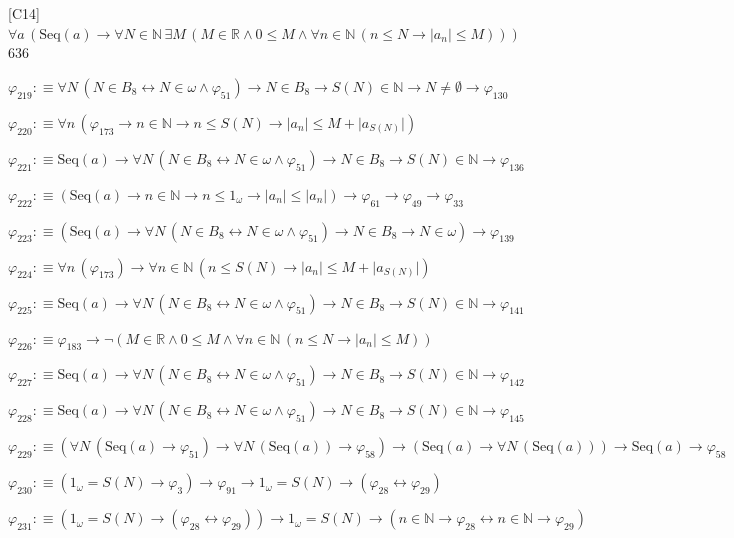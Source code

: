 \begin{fullproof}{[C14]}{$\forall a\,(\mathrm{Seq}(a) \to \forall N \in \mathbb{N}\,\exists M\,(M \in \mathbb{R} \land 0 \leq M \land \forall n \in \mathbb{N}\,(n \leq N \to \lvert a_{n} \rvert \leq M)))$}{636}
\begin{abbrevlist}
\item $\varphi_{219} :\equiv \forall N\,(N \in B_{8} \leftrightarrow N \in \omega \land \varphi_{51}) \to N \in B_{8} \to S(N) \in \mathbb{N} \to N \neq \emptyset \to \varphi_{130}$
\item $\varphi_{220} :\equiv \forall n\,(\varphi_{173} \to n \in \mathbb{N} \to n \leq S(N) \to \lvert a_{n} \rvert \leq M + \lvert a_{S(N)} \rvert)$
\item $\varphi_{221} :\equiv \mathrm{Seq}(a) \to \forall N\,(N \in B_{8} \leftrightarrow N \in \omega \land \varphi_{51}) \to N \in B_{8} \to S(N) \in \mathbb{N} \to \varphi_{136}$
\item $\varphi_{222} :\equiv (\mathrm{Seq}(a) \to n \in \mathbb{N} \to n \leq 1_{\omega} \to \lvert a_{n} \rvert \leq \lvert a_{n} \rvert) \to \varphi_{61} \to \varphi_{49} \to \varphi_{33}$
\item $\varphi_{223} :\equiv (\mathrm{Seq}(a) \to \forall N\,(N \in B_{8} \leftrightarrow N \in \omega \land \varphi_{51}) \to N \in B_{8} \to N \in \omega) \to \varphi_{139}$
\item $\varphi_{224} :\equiv \forall n\,(\varphi_{173}) \to \forall n \in \mathbb{N}\,(n \leq S(N) \to \lvert a_{n} \rvert \leq M + \lvert a_{S(N)} \rvert)$
\item $\varphi_{225} :\equiv \mathrm{Seq}(a) \to \forall N\,(N \in B_{8} \leftrightarrow N \in \omega \land \varphi_{51}) \to N \in B_{8} \to S(N) \in \mathbb{N} \to \varphi_{141}$
\item $\varphi_{226} :\equiv \varphi_{183} \to \neg (M \in \mathbb{R} \land 0 \leq M \land \forall n \in \mathbb{N}\,(n \leq N \to \lvert a_{n} \rvert \leq M))$
\item $\varphi_{227} :\equiv \mathrm{Seq}(a) \to \forall N\,(N \in B_{8} \leftrightarrow N \in \omega \land \varphi_{51}) \to N \in B_{8} \to S(N) \in \mathbb{N} \to \varphi_{142}$
\item $\varphi_{228} :\equiv \mathrm{Seq}(a) \to \forall N\,(N \in B_{8} \leftrightarrow N \in \omega \land \varphi_{51}) \to N \in B_{8} \to S(N) \in \mathbb{N} \to \varphi_{145}$
\item $\varphi_{229} :\equiv (\forall N\,(\mathrm{Seq}(a) \to \varphi_{51}) \to \forall N\,(\mathrm{Seq}(a)) \to \varphi_{58}) \to (\mathrm{Seq}(a) \to \forall N\,(\mathrm{Seq}(a))) \to \mathrm{Seq}(a) \to \varphi_{58}$
\item $\varphi_{230} :\equiv (1_{\omega} = S(N) \to \varphi_{3}) \to \varphi_{91} \to 1_{\omega} = S(N) \to (\varphi_{28} \leftrightarrow \varphi_{29})$
\item $\varphi_{231} :\equiv (1_{\omega} = S(N) \to (\varphi_{28} \leftrightarrow \varphi_{29})) \to 1_{\omega} = S(N) \to (n \in \mathbb{N} \to \varphi_{28} \leftrightarrow n \in \mathbb{N} \to \varphi_{29})$

\end{abbrevlist}
\end{fullproof}
